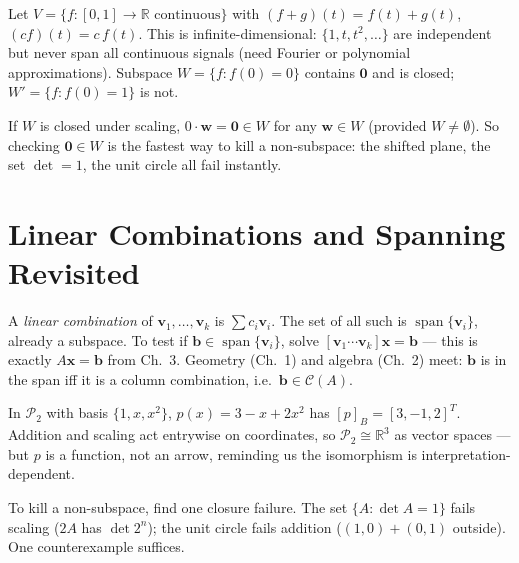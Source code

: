 \begin{example}
Let $V=\{f:[0,1]\to\mathbb{R}\text{ continuous}\}$ with $(f+g)(t)=f(t)+g(t)$, $(cf)(t)=c\,f(t)$. This is infinite-dimensional: $\{1,t,t^2,\dots\}$ are independent but never span all continuous signals (need Fourier or polynomial approximations). Subspace $W=\{f:f(0)=0\}$ contains $\mathbf{0}$ and is closed; $W'=\{f:f(0)=1\}$ is not.
\end{example}

\begin{remark}
If $W$ is closed under scaling, $0\cdot\mathbf{w}=\mathbf{0}\in W$ for any $\mathbf{w}\in W$ (provided $W\neq\emptyset$). So checking $\mathbf{0}\in W$ is the fastest way to kill a non-subspace: the shifted plane, the set $\det=1$, the unit circle all fail instantly.
\end{remark}



\section{Linear Combinations and Spanning Revisited}
\label{sec:lin-comb-detail}
A \emph{linear combination} of $\mathbf{v}_1,\dots,\mathbf{v}_k$ is $\sum c_i\mathbf{v}_i$. The set of all such is $\operatorname{span}\{\mathbf{v}_i\}$, already a subspace. To test if $\mathbf{b}\in\operatorname{span}\{\mathbf{v}_i\}$, solve $[\mathbf{v}_1\cdots\mathbf{v}_k]\mathbf{x}=\mathbf{b}$ --- this is exactly $A\mathbf{x}=\mathbf{b}$ from Ch.~3. Geometry (Ch.~1) and algebra (Ch.~2) meet: $\mathbf{b}$ is in the span iff it is a column combination, i.e.\ $\mathbf{b}\in\mathcal{C}(A)$.

\begin{example}
In $\mathcal{P}_2$ with basis $\{1,x,x^2\}$, $p(x)=3-x+2x^2$ has $[p]_B=[3,-1,2]^T$. Addition and scaling act entrywise on coordinates, so $\mathcal{P}_2\cong\mathbb{R}^3$ as vector spaces --- but $p$ is a function, not an arrow, reminding us the isomorphism is interpretation-dependent.
\end{example}



\begin{remark}
To kill a non-subspace, find one closure failure. The set $\{A:\det A=1\}$ fails scaling ($2A$ has $\det 2^n$); the unit circle fails addition ($(1,0)+(0,1)$ outside). One counterexample suffices.
\end{remark}


